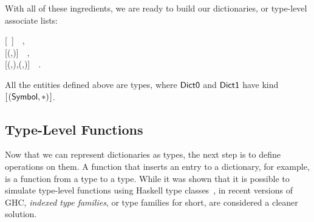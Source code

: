 With all of these ingredients, we are ready to build our dictionaries, or
type-level associate lists:
\begin{hscode}\SaveRestoreHook
{}%
%
\>[B]{}\;\mathrel{=}\mbox{\textquotesingle}[~]~~,{}\<[E]%
\\
\>[B]{}\;\mathrel{=}\mbox{\textquotesingle}[\mbox{\textquotesingle}(,)]~~,{}\<[E]%
\\
\>[B]{}\;\mathrel{=}\mbox{\textquotesingle}[\mbox{\textquotesingle}(,),\mbox{\textquotesingle}(,)]~~.{}\<[E]%
\ColumnHook
\end{hscode}\resethooks
All the entities defined above are types, where \ensuremath{\Conid{Dict0}} and \ensuremath{\Conid{Dict1}}
have kind \ensuremath{[\mskip1.5mu (\Conid{Symbol},\mathbin{*})\mskip1.5mu]}.

\subsection{Type-Level Functions}

Now that we can represent dictionaries as types, the next step is to define
operations on them. A function that inserts an entry to a dictionary, for
example, is a function from a type to a type. While it was shown that it is
possible to simulate type-level functions using Haskell type
classes~\cite{McBride:02:Faking}, in recent versions of GHC, {\em indexed type
families}, or type families for short, are considered a cleaner solution.


